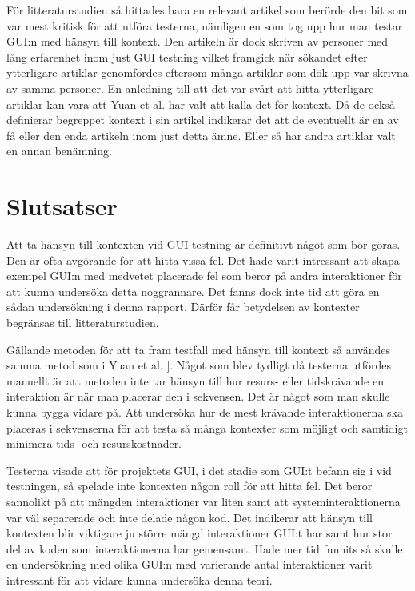 För litteraturstudien så hittades bara en relevant artikel som berörde den bit som var mest kritisk för att utföra testerna, nämligen en som tog upp hur man testar GUI:n med hänsyn till kontext. Den artikeln är dock skriven av personer med lång erfarenhet inom just GUI testning vilket framgick när sökandet efter ytterligare artiklar genomfördes eftersom många artiklar som dök upp var skrivna av samma personer. En anledning  till att det var svårt att hitta ytterligare artiklar kan vara att Yuan et al. \cite{yuan2011gui} har valt att kalla det för kontext. Då de också definierar begreppet kontext i sin artikel indikerar det att de eventuellt är en av få eller den enda artikeln inom just detta ämne. Eller så har andra artiklar valt en annan benämning.

\section{Slutsatser}
\label{sec:conclusions-holmberg}

Att ta hänsyn till kontexten vid GUI testning är definitivt något som bör göras. Den är ofta avgörande för att hitta vissa fel. Det hade varit intressant att skapa exempel GUI:n med medvetet placerade fel som beror på andra interaktioner för att kunna undersöka detta noggrannare. Det fanns dock inte tid att göra en sådan undersökning i denna rapport. Därför får betydelsen av kontexter begränsas till litteraturstudien.

Gällande metoden för att ta fram testfall med hänsyn till kontext så användes samma metod som i Yuan et al. \cite{yuan2011gui}]. Något som blev tydligt då testerna utfördes manuellt är att metoden inte tar hänsyn till hur resurs- eller tidskrävande en interaktion är när man placerar den i sekvensen. Det är något som man skulle kunna bygga vidare på. Att undersöka hur de mest krävande interaktionerna ska placeras i sekvenserna för att testa så många kontexter som möjligt och samtidigt minimera tids- och resurskostnader.

Testerna visade att för projektets GUI, i det stadie som GUI:t befann sig i vid testningen, så spelade inte kontexten någon roll för att hitta fel. Det beror sannolikt på att mängden interaktioner var liten samt att systeminteraktionerna var väl separerade och inte delade någon kod. Det indikerar att hänsyn till kontexten blir viktigare ju större mängd interaktioner GUI:t har samt hur stor del av koden som interaktionerna har gemensamt. Hade mer tid funnits så skulle en undersökning med olika GUI:n med varierande antal interaktioner varit intressant för att vidare kunna undersöka denna teori.

